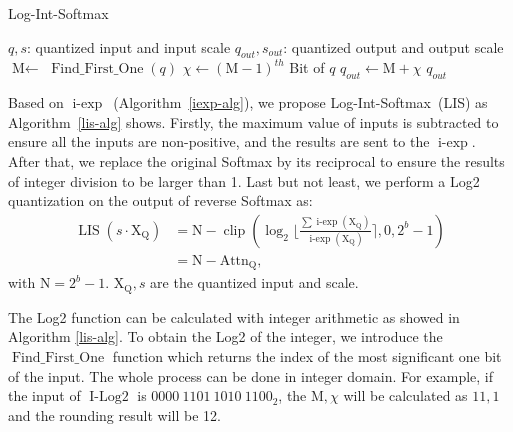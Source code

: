 \documentclass{article}
\begin{document}
\begin{algorithm}[t]
\caption{Log-Int-Softmax}  
\label{lis-alg}
\begin{algorithmic}[0]  $q,s$: quantized input and input scale
 $q_{out},s_{out}$: quantized output and output scale
\vskip 0.075in
{
\STATE $ \textrm{M} \leftarrow $ $\operatorname{Find\_First\_One}(q)$
\STATE $ \chi \leftarrow (\textrm{M}-1)^{th}$ Bit of $q$
\STATE $q_{out}\leftarrow \textrm{M}+\chi $
\STATE \Return $q_{out}$
}
\ENDFUNCTION
{}
\ENDFUNCTION
\end{algorithmic}  
\end{algorithm}  

Based on $\operatorname{i-exp}$~(Algorithm~\ref{iexp-alg}), we propose Log-Int-Softmax~(LIS) as Algorithm~\ref{lis-alg} shows. Firstly, the maximum value of inputs is subtracted to ensure all the inputs are non-positive, and the results are sent to the $\operatorname{i-exp}$. After that, we replace the original Softmax by its reciprocal to ensure the results of integer division to be larger than 1. Last but not least, we perform a Log2 quantization on the output of reverse Softmax as:
\begin{align}
      \operatorname{LIS}(s\cdot \textrm{X}_\textrm{Q})&= \textrm{N} - \operatorname{clip}(\log_2\lfloor\frac{\sum \operatorname{i-exp}(\textrm{X}_\textrm{Q})}{\operatorname{i-exp}(\textrm{X}_\textrm{Q})}\rceil, 0, 2^b-1)\\
      &= \textrm{N}-\textrm{Attn}_\textrm{Q},
     \label{log2_equation}
\end{align}
with $\textrm{N}=2^b-1$. $\textrm{X}_\textrm{Q}, s$ are the quantized input and scale. 

The Log2 function can be calculated with integer arithmetic as showed in Algorithm \ref{lis-alg}. To obtain the Log2 of the integer, we introduce the $\operatorname{Find\_First\_One}$ function which returns the index of the most significant one bit of the input. The whole process can be done in integer domain.
For example, if the input of $\operatorname{I-Log2}$ is $0000\ 1101\ 1010\ 1100_{2}$, the $\textrm{M}, \chi$ will be calculated as $11,1$ and the rounding result will be 12.
\end{document}
